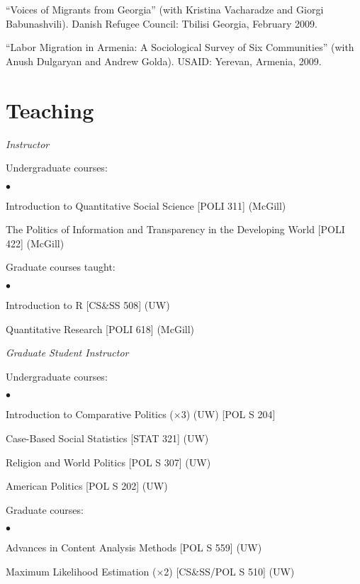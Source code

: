 \documentclass[margin,line]{res}
\newenvironment{list1}{
  \begin{list}{\ding{113}}{%
      \setlength{\itemsep}{0in}
      \setlength{\parsep}{0in} \setlength{\parskip}{0in}
      \setlength{\topsep}{0in} \setlength{\partopsep}{0in} 
      \setlength{\leftmargin}{0.17in}}}{\end{list}}
\newenvironment{list2}{
  \begin{list}{$\bullet$}{%
      \setlength{\itemsep}{0in}
      \setlength{\parsep}{0in} \setlength{\parskip}{0in}
      \setlength{\topsep}{0in} \setlength{\partopsep}{0in} 
      \setlength{\leftmargin}{0.2in}}}{\end{list}}
\begin{document}
{\begin{resume}
``Voices of Migrants
from Georgia''  (with Kristina Vacharadze and Giorgi Babunashvili).
Danish Refugee Council: Tbilisi Georgia, February 2009.

``Labor Migration in Armenia:
A Sociological Survey of Six Communities'' (with Anush Dulgaryan and
Andrew Golda).  USAID: Yerevan, Armenia, 2009.


\section{\sc Teaching}
{\em Instructor}\\
\vspace{-.1in}
\begin{list1}

\item[] Undergraduate courses:
   \begin{list2}
   \item[] Introduction to Quantitative Social Science [POLI 311]
     (McGill)
   \item[] The Politics of Information and Transparency in the
     Developing World [POLI 422] (McGill)
\end{list2}

 \item[] Graduate courses taught:
   \begin{list2}
   \item[] Introduction to R  [CS\&SS 508] (UW)
   \item[] Quantitative Research [POLI 618] (McGill)
\end{list2}
\end{list1}

{\em Graduate Student Instructor } \\
\vspace{-.1in}
\begin{list1}
 \item[] Undergraduate courses:
   \begin{list2}
   \item[] Introduction to Comparative Politics ($\times$3) (UW)
   [POL S 204]
   \item[] Case-Based Social Statistics [STAT 321] (UW)
   \item[]Religion and World Politics [POL S 307] (UW)
     \item[] American Politics [POL S 202] (UW)
\end{list2}
\item[] Graduate courses:
   \begin{list2}
     \item [] Advances in Content Analysis Methods [POL S 559] (UW)
     \item [] Maximum Likelihood Estimation ($\times$2) [CS\&SS/POL S
       510] (UW)
\end{list2}
\end{list1}


\end{resume}}
\end{document}
